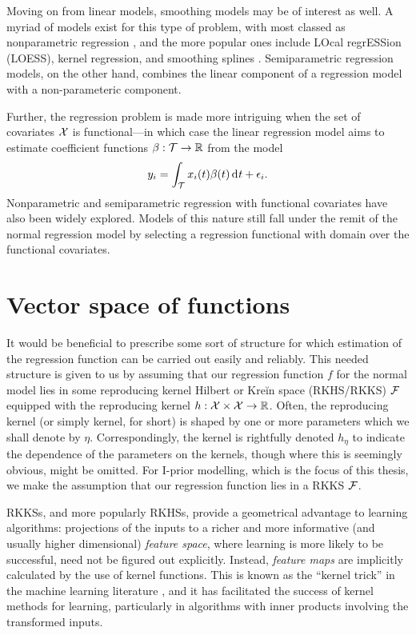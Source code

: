\documentclass[11pt,twoside,openright,showframe]{report}
\begin{document}
Moving on from linear models, smoothing models may be of interest as well.
A myriad of models exist for this type of problem, with most classed as nonparametric regression \citep{wassermann2006all}, and the more popular ones include LOcal regrESSion (LOESS), kernel regression, and smoothing splines \citep{wahba1990spline}.
Semiparametric regression models, on the other hand, combines the linear component of a regression model with a non-parameteric component.

Further, the regression problem is made more intriguing when the set of covariates ${\mathcal X}$ is functional---in which case the linear regression model aims to estimate coefficient functions $\beta:{\mathcal T} \to \mathbb{R}$ from the model
\[
  y_i = \int_{\mathcal T} x_i(t)\beta(t) \operatorname{d}\hspace{0.5pt}\! t + \epsilon_i.
\]
Nonparametric and semiparametric regression with functional covariates \citep{ramsay2005functional} have also been widely explored.
Models of this nature still fall under the remit of the normal regression model by selecting a regression functional with domain over the functional covariates.

\section{Vector space of functions}

It would be beneficial to prescribe some sort of structure for which estimation of the regression function can be carried out easily and reliably. 
This needed structure is given to us by assuming that our regression function $f$ for the normal model lies in some reproducing kernel Hilbert or Kreĭn space (RKHS/RKKS) ${\mathcal F}$ equipped with the reproducing kernel $h:{\mathcal X} \times {\mathcal X} \to \mathbb{R}$.
Often, the reproducing kernel (or simply kernel, for short) is shaped by one or more parameters which we shall denote by $\eta$.
Correspondingly, the kernel is rightfully denoted $h_\eta$ to indicate the dependence of the parameters on the kernels, though where this is seemingly obvious, might be omitted.
For I-prior modelling, which is the focus of this thesis, we make the assumption that our regression function lies in a RKKS ${\mathcal F}$.

RKKSs, and more popularly RKHSs, provide a geometrical advantage to learning algorithms: projections of the inputs to a richer and more informative (and usually higher dimensional) \emph{feature space}, where learning is more likely to be successful, need not be figured out explicitly.
Instead, \emph{feature maps} are implicitly calculated by the use of kernel functions. 
This is known as the ``kernel trick'' in the machine learning literature \citep{hofmann2008kernel}, and it has facilitated the success of kernel methods for learning, particularly in algorithms with inner products involving the transformed inputs. 
\end{document}
